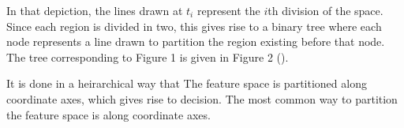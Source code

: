 \documentclass[12pt]{article}
\begin{document}
 In that depiction, the lines drawn at $t_i$ represent the $i$th division of the space. Since each region is divided in two, this gives rise to a binary tree where each node represents a line drawn to partition the region existing before that node. The tree corresponding to Figure 1 is given in Figure 2 (\cite{HTF}).

 It is done in a heirarchical way that The feature space is partitioned along coordinate axes, which gives rise to decision. The most common way to partition the feature space is along coordinate axes. 

%
%
%




\end{document}
